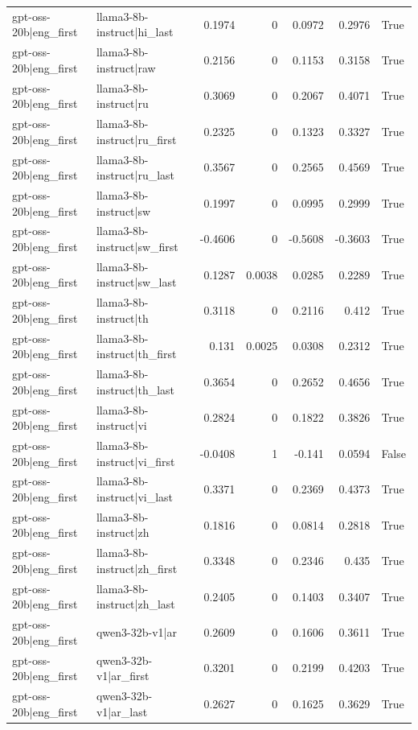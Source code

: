 \begin{table}
\begin{tabular}{l l r r r r l}
gpt-oss-20b|eng_first & llama3-8b-instruct|hi_last & 0.1974 & 0 & 0.0972 & 0.2976 & True \\
gpt-oss-20b|eng_first & llama3-8b-instruct|raw & 0.2156 & 0 & 0.1153 & 0.3158 & True \\
gpt-oss-20b|eng_first & llama3-8b-instruct|ru & 0.3069 & 0 & 0.2067 & 0.4071 & True \\
gpt-oss-20b|eng_first & llama3-8b-instruct|ru_first & 0.2325 & 0 & 0.1323 & 0.3327 & True \\
gpt-oss-20b|eng_first & llama3-8b-instruct|ru_last & 0.3567 & 0 & 0.2565 & 0.4569 & True \\
gpt-oss-20b|eng_first & llama3-8b-instruct|sw & 0.1997 & 0 & 0.0995 & 0.2999 & True \\
gpt-oss-20b|eng_first & llama3-8b-instruct|sw_first & -0.4606 & 0 & -0.5608 & -0.3603 & True \\
gpt-oss-20b|eng_first & llama3-8b-instruct|sw_last & 0.1287 & 0.0038 & 0.0285 & 0.2289 & True \\
gpt-oss-20b|eng_first & llama3-8b-instruct|th & 0.3118 & 0 & 0.2116 & 0.412 & True \\
gpt-oss-20b|eng_first & llama3-8b-instruct|th_first & 0.131 & 0.0025 & 0.0308 & 0.2312 & True \\
gpt-oss-20b|eng_first & llama3-8b-instruct|th_last & 0.3654 & 0 & 0.2652 & 0.4656 & True \\
gpt-oss-20b|eng_first & llama3-8b-instruct|vi & 0.2824 & 0 & 0.1822 & 0.3826 & True \\
gpt-oss-20b|eng_first & llama3-8b-instruct|vi_first & -0.0408 & 1 & -0.141 & 0.0594 & False \\
gpt-oss-20b|eng_first & llama3-8b-instruct|vi_last & 0.3371 & 0 & 0.2369 & 0.4373 & True \\
gpt-oss-20b|eng_first & llama3-8b-instruct|zh & 0.1816 & 0 & 0.0814 & 0.2818 & True \\
gpt-oss-20b|eng_first & llama3-8b-instruct|zh_first & 0.3348 & 0 & 0.2346 & 0.435 & True \\
gpt-oss-20b|eng_first & llama3-8b-instruct|zh_last & 0.2405 & 0 & 0.1403 & 0.3407 & True \\
gpt-oss-20b|eng_first & qwen3-32b-v1|ar & 0.2609 & 0 & 0.1606 & 0.3611 & True \\
gpt-oss-20b|eng_first & qwen3-32b-v1|ar_first & 0.3201 & 0 & 0.2199 & 0.4203 & True \\
gpt-oss-20b|eng_first & qwen3-32b-v1|ar_last & 0.2627 & 0 & 0.1625 & 0.3629 & True \\

\end{tabular}
\end{table}
